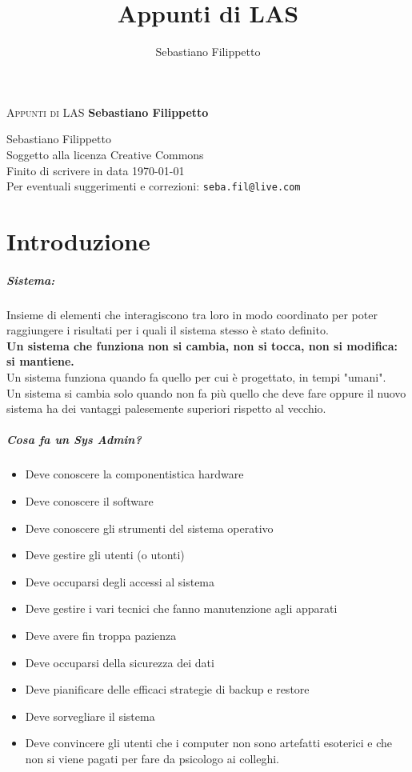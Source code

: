 \documentclass[a4paper]{report}
\title{\Huge{Appunti di LAS}}
\author{Sebastiano Filippetto}
\begin{document}
\begin{minipage}[c][\textheight][c]{\textwidth}\centering
\textsc{\Huge Appunti di LAS}
\vfill
\textbf{\Large Sebastiano Filippetto}
\vfill
\end{minipage}
\newpage
\begin{minipage}[c][\textheight][c]{\textwidth}
\centering
\textcopyright Sebastiano Filippetto
\\
Soggetto alla licenza Creative Commons\\
Finito di scrivere in data \today \\
Per eventuali suggerimenti e correzioni: \texttt{seba.fil@live.com}
\end{minipage}

\tableofcontents
\newpage
\chapter{Introduzione}
\paragraph{Sistema:} Insieme di elementi che interagiscono tra loro in modo coordinato per poter raggiungere i risultati per i quali il sistema stesso è stato definito. \\
\textbf{Un sistema che funziona non si cambia, non si tocca, non si modifica: si mantiene.}\\
Un sistema funziona quando fa quello per cui è progettato, in tempi "umani".\\
Un sistema si cambia solo quando non fa più quello che deve fare oppure il nuovo sistema ha dei vantaggi palesemente superiori rispetto al vecchio.\\
\paragraph{Cosa fa un Sys Admin?}
\begin{itemize}
\item Deve conoscere la componentistica hardware
\item Deve conoscere il software
\item Deve conoscere gli strumenti del sistema operativo
\item Deve gestire gli utenti (o utonti)
\item Deve occuparsi degli accessi al sistema
\item Deve gestire i vari tecnici che fanno manutenzione agli apparati
\item Deve avere fin troppa pazienza
\item Deve occuparsi della sicurezza dei dati
\item Deve pianificare delle efficaci strategie di backup e restore
\item Deve sorvegliare il sistema
\item Deve convincere gli utenti che i computer non sono artefatti esoterici e che non si viene pagati per fare da psicologo ai colleghi.
\end{itemize}
\end{document}
